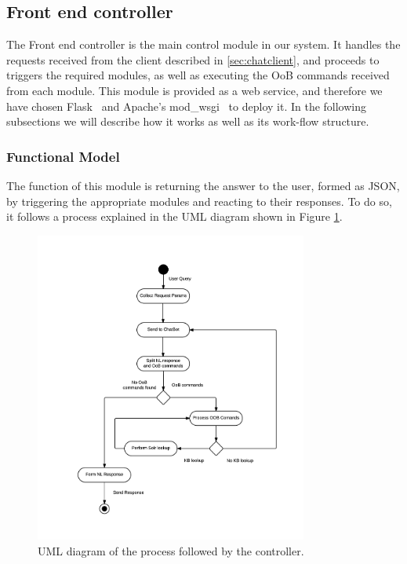 \subsection{Front end controller}
\label{sec:frontendcon}
The Front end controller is the main control module in our system. It handles the requests received from the client described in \ref{sec:chatclient}, and proceeds to triggers the required modules, as well as executing the \ac{OoB} commands received from each module. This module is provided as a web service, and therefore we have chosen Flask~\cite{flask0101} and Apache's mod\_wsgi~\cite{modwsgi} to deploy it. In the following subsections we will describe how it works as well as its work-flow structure.

\subsubsection{Functional Model}

The function of this module is returning the answer to the user, formed as JSON, by triggering the appropriate modules and reacting to their responses. To do so, it follows a process explained in the UML diagram shown in Figure \ref{fig:fe-model1}.

\begin{figure}[!htbp]
    \centering
    \includegraphics[width=0.8\textwidth]{img/prot/activityDiagram.png} 
    \caption{UML diagram of the process followed by the controller.}
    \label{fig:fe-model1}
\end{figure}

